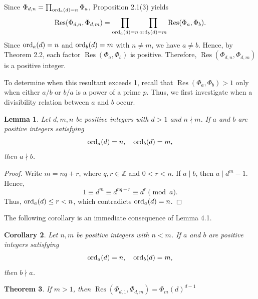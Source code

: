 \documentclass[10pt,leqno]{amsart}
\newtheorem{theorem}{Theorem}[section]
\newtheorem{lemma}[theorem]{Lemma}
\newtheorem{corollary}[theorem]{Corollary}
\theoremstyle{definition}
\theoremstyle{remark}
\numberwithin{equation}{section}
\def\zz{\mathbb{Z}}
\def\ord{{\rm ord}}
\newcommand{\res}{\operatorname{Res}}
\begin{document}
Since $\Phi_{d,n} = \prod_{\ord_a(d) = n}\Phi_a$, Proposition 2.1(3) yields
$$\res(\Phi_{d,n},\Phi_{d,m}) = \prod_{\ord_a(d) = n}\prod_{\ord_b(d) = m}\res(\Phi_a,\Phi_b).$$
Since $\ord_a(d)=n$ and $\ord_b(d) = m$ with $n\neq m$, we have $a\neq b$. Hence, by Theorem 2.2, each factor $\res(\Phi_a,\Phi_b)$ is positive. Therefore, $\res(\Phi_{d,n},\Phi_{d,m})$ is a positive integer. 

To determine when this resultant exceeds 1, recall that $\res(\Phi_a,\Phi_b)>1$ only when either $a/b$ or $b/a$ is a power of a prime $p$. Thus, we first investigate when a divisibility relation between $a$ and $b$ occur.

\begin{lemma}
    Let $d,m,n$ be positive integers with $d>1$ and $n\nmid m$. If $a$ and $b$ are positive integers satisfying
    $$\ord_a(d) = n,\quad \ord_b(d) = m,$$
    then $a\nmid b$.
\end{lemma}

\begin{proof}
    Write $m = nq+r$, where $q,r\in\zz$ and $0<r<n$. If $a\mid b$, then $a\mid d^m-1$. Hence,
    $$1\equiv d^m\equiv d^{nq+r}\equiv d^r\pmod a.$$
    Thus, $\ord_a(d)\leq r<n$, which contradicts $\ord_a(d) = n$.
\end{proof}

The following corollary is an immediate consequence of Lemma 4.1.

\begin{corollary}
    Let $n,m$ be positive integers with $n<m$. If $a$ and $b$ are positive integers satisfying
    $$\ord_a(d) = n,\quad \ord_b(d) = m,$$
    then $b\nmid a$. 
\end{corollary}

\begin{theorem}
    If $m>1$, then $\res(\Phi_{d,1},\Phi_{d,m}) = \Phi_m(d)^{d-1}$
\end{theorem}
\end{document}
